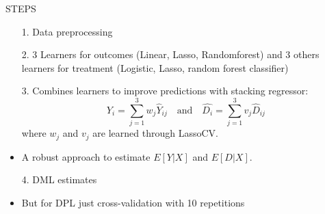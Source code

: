 \documentclass[aspectratio=169]{beamer}
\begin{document}
\begin{frame}{STEPS}

\begin{itemize}
    \item[1.] Data preprocessing

    \item[2.] 3 Learners for outcomes (Linear, Lasso, Randomforest) and 3 others learners for treatment (Logistic, Lasso, random forest classifier)
    \item[3.] Combines learners to improve predictions with stacking regressor: \[         \hat{Y_i} = \sum_{j=1}^{3} w_j \hat{Y}_{ij}      \text{  }  \text{ and } \text{  }  \hat{D_i} = \sum_{j=1}^{3} v_j \hat{D}_{ij}         \] 
    where \( w_j \)  and \( v_j \) are learned through LassoCV.
        \item A robust approach to estimate \( E[Y|X] \) and \( E[D|X] \).
    \item[4.] DML estimates 
    \item But for DPL just cross-validation with 10 repetitions
\end{itemize}
    
\end{frame}
\end{document}

